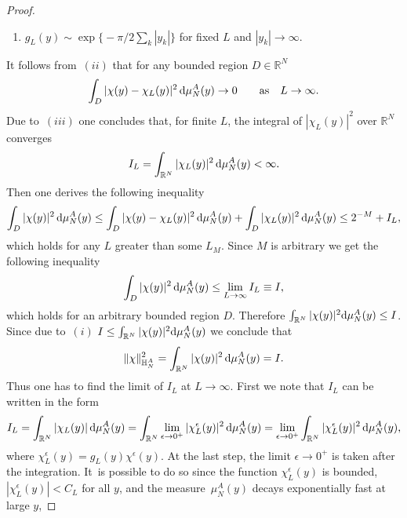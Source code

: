 \documentclass[pdftex]{sigma}%
\numberwithin{equation}{section}
\begin{document}
\begin{proof}
\begin{enumerate}[label=($\roman*$)]
\item $g_L(y)\sim \exp\big\{-\pi/2\sum_k |y_k|\big\}$ for fixed $L$ and $|y_k|\to\infty$.\label{iii}

\end{enumerate}

It follows from~$(ii)$ that for any bounded region $D\in \mathbb R^{N}$
\begin{gather*}
\int_D |\chi(y)-\chi_L(y)|^2 \,{\rm d}\mu_N^A(y) \to 0 \qquad \text{as} \quad L\to\infty.
\end{gather*}
 Due to~$(iii)$ one concludes that, for finite $L$, the integral of $|\chi_L(y)|^2$ over $\mathbb R^N$ converges
\begin{gather*}
I_L=\int_{\mathbb R^N} |\chi_L(y)|^2\, {\rm d}\mu_N^A(y)<\infty.
\end{gather*}
Then one derives the following inequality
\begin{gather*}
\int_{D} |\chi(y)|^2\, {\rm d}\mu_N^A(y) \leq \int_D |\chi(y)-\chi_L(y)|^2\, {\rm d}\mu_N^A(y)+ \int_D |\chi_L(y)|^2\, {\rm d}\mu_N^A(y)\leq 2^{-M} + I_L,
\end{gather*}
which holds for any $L$ greater than some $L_M$. Since $M$ is arbitrary we get the following inequality
\begin{gather*}%
\int_{D} |\chi(y)|^2 \,{\rm d}\mu_N^A(y)\leq \lim_{L\to\infty} I_L\equiv I,
\end{gather*}
which holds for an arbitrary bounded region $D$. Therefore $\int_{\mathbb R^N} |\chi(y)|^2 {\rm d}\mu_N^A(y)\leq I$. Since due to~$(i)$
$I\leq\int_{\mathbb R^N} |\chi(y)|^2 {\rm d}\mu_N^A(y)$ we conclude that
\begin{gather*}
\|\chi\|^2_{\mathbb H_N^A}=\int_{\mathbb R^N} |\chi(y)|^2\, {\rm d}\mu_N^A(y) = I.
\end{gather*}
Thus one has to find the limit of $I_L$ at $L\to\infty$. First we note that $I_L$ can be written in the form
\begin{gather*}
I_L=\int_{\mathbb R^N} |\chi_L(y)|\,{\rm d}\mu_N^A(y)=\int_{\mathbb R^N}\lim_{\epsilon\to 0^+} |\chi_L^\epsilon(y)|^2\,{\rm d}\mu_N^A(y)=
\lim_{\epsilon\to 0^+}\int_{\mathbb R^N}|\chi_L^\epsilon(y)|^2\, {\rm d}\mu_N^A(y),
\end{gather*}
where $\chi_L^\epsilon(y)=g_L(y)\chi^\epsilon(y)$. At the last step, the limit $\epsilon\to 0^+$ is taken after the integration. It~is
possible to do so since the function $\chi_L^\epsilon(y)$ is bounded, $|\chi_L^\epsilon(y)|<C_L$ for all $y$, and the measure~$\mu_N^A(y)$
decays exponentially fast at large $y$,

\end{proof}
\end{document}
